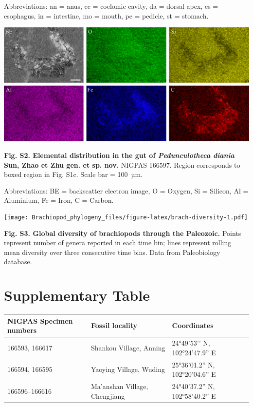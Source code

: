 \documentclass[openany]{book}
\theoremstyle{definition}
\theoremstyle{definition}
\theoremstyle{definition}
\theoremstyle{remark}
\begin{document}
Abbreviations: an = anus, cc = coelomic cavity, da = dorsal apex, es =
esophagus, in = intestine, mo = mouth, pe = pedicle, st = stomach.

\clearpage

\begin{center}\includegraphics[width=0.8\linewidth]{images/image2} \end{center}

\textbf{Fig. S2. Elemental distribution in the gut of
\emph{Pedunculotheca diania} Sun, Zhao et Zhu gen. et sp. nov.} NIGPAS
166597. Region corresponds to boxed region in Fig. S1c. Scale bar =
100~µm.

Abbreviations: BE = backscatter electron image, O = Oxygen, Si =
Silicon, Al = Aluminium, Fe = Iron, C = Carbon.

\clearpage

\texttt{[image: Brachiopod\_phylogeny\_files/figure-latex/brach-diversity-1.pdf]}

\textbf{Fig. S3. Global diversity of brachiopods through the Paleozoic.}
Points represent number of genera reported in each time bin; lines
represent rolling mean diversity over three consecutive time bins. Data
from Paleobiology database.

\clearpage

\hypertarget{table}{\chapter*{Supplementary Table}\label{table}}

\begin{tabular}{l|l|l}
\hline
NIGPAS Specimen numbers & Fossil locality & Coordinates\\
\hline
166593, 166617 & Shankou Village, Anning & 24°49’53’’ N, 102°24’47.9” E\\
\hline
166594, 166595 & Yaoying Village, Wuding & 25°36’01.2” N, 102°20’04.6” E\\
\hline
166596--166616 & Ma'anshan Village, Chengjiang & 24°40’37.2” N, 102°58’40.2” E\\
\hline
\end{tabular}
\end{document}

